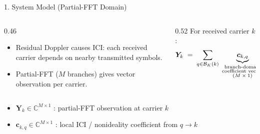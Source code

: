 \documentclass[aspectratio=169,10pt]{beamer}
\newcommand{\vY}{\bm{Y}}
\newcommand{\vc}{\bm{c}}
\newcommand{\vn}{\bm{n}}
\newcommand{\Cx}{\mathbb{C}}
\newcommand{\Bk}{\mathcal{B}_K(k)}
\begin{document}
\begin{frame}{1. System Model (Partial-FFT Domain)}

  \begin{columns}[T,onlytextwidth]
    \begin{column}{0.46\textwidth}
      \begin{itemize}\setlength{\itemsep}{0.5em}
        \item Residual Doppler causes ICI: each received carrier depends on nearby transmitted symbols.
        \item Partial-FFT ($M$ branches) gives vector observation per carrier.
      \end{itemize}
    \end{column}
    \begin{column}{0.52\textwidth}
      For received carrier $k$:
      \vspace{-0.2em}
      \[
        \vY_k \;=\;
        \sum_{q\in\Bk}\;
        \underbrace{\vc_{k,q}}_{\substack{\text{\scriptsize branch-domain}\\\text{\scriptsize coefficient vector}\\\text{\scriptsize $(M\times 1)$}}}\;
        \underbrace{s_q}_{\substack{\text{\scriptsize transmitted}\\\text{\scriptsize symbol}}}\;+\;
        \underbrace{\vn_k}_{\substack{\text{\scriptsize noise}\\\text{\scriptsize vector}}}
      \]
    \end{column}
  \end{columns}

  \vspace{0.5em}
  \begin{itemize}\setlength{\itemsep}{0.2em}
    \item $\vY_{k}\in\Cx^{M\times 1}$ : partial-FFT observation at carrier $k$
    \item $\vc_{k,q}\in\Cx^{M\times 1}$ : local ICI / nonideality coefficient from $q\to k$
  \end{itemize}

  \vspace{0.4em}
  \begin{center}
\end{center}
\end{frame}
\end{document}
